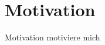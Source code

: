 \section*{Motivation}\label{sec:motivation}


\begin{frame}{Motivation}
motiviere mich

\end{frame}
